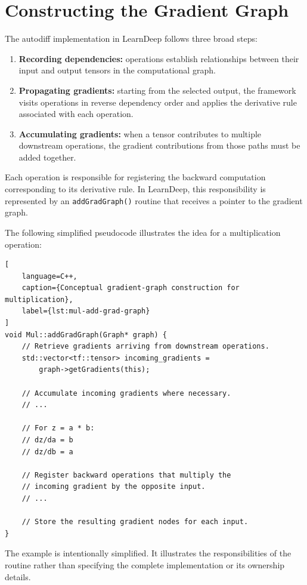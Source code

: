 \section{Constructing the Gradient Graph}

The autodiff implementation in LearnDeep follows three broad steps:

\begin{enumerate}
    \item \textbf{Recording dependencies:} operations establish relationships between their input and output tensors in the computational graph.
    \item \textbf{Propagating gradients:} starting from the selected output, the framework visits operations in reverse dependency order and applies the derivative rule associated with each operation.
    \item \textbf{Accumulating gradients:} when a tensor contributes to multiple downstream operations, the gradient contributions from those paths must be added together.
\end{enumerate}

Each operation is responsible for registering the backward computation corresponding to its derivative rule. In LearnDeep, this responsibility is represented by an \texttt{addGradGraph()} routine that receives a pointer to the gradient graph.

The following simplified pseudocode illustrates the idea for a multiplication operation:

\begin{lstlisting}[
    language=C++,
    caption={Conceptual gradient-graph construction for multiplication},
    label={lst:mul-add-grad-graph}
]
void Mul::addGradGraph(Graph* graph) {
    // Retrieve gradients arriving from downstream operations.
    std::vector<tf::tensor> incoming_gradients =
        graph->getGradients(this);

    // Accumulate incoming gradients where necessary.
    // ...

    // For z = a * b:
    // dz/da = b
    // dz/db = a

    // Register backward operations that multiply the
    // incoming gradient by the opposite input.
    // ...

    // Store the resulting gradient nodes for each input.
}
\end{lstlisting}

The example is intentionally simplified. It illustrates the responsibilities of the routine rather than specifying the complete implementation or its ownership details.

